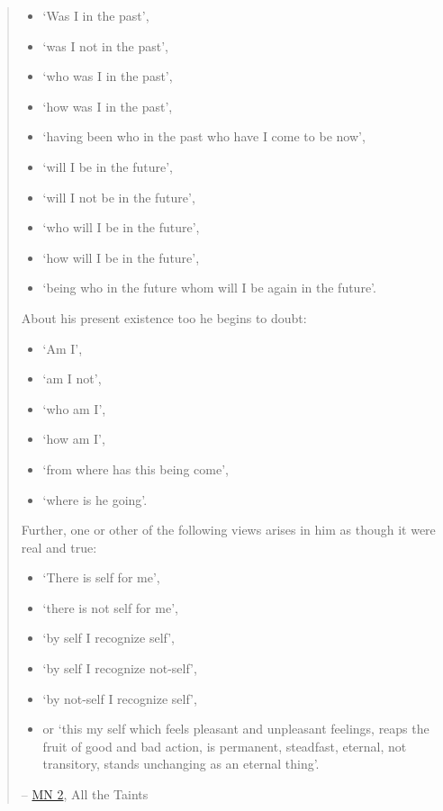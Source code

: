 \begin{quote}
\begin{itemize}
\item
  `Was I in the past',
\item
  `was I not in the past',
\item
  `who was I in the past',
\item
  `how was I in the past',
\item
  `having been who in the past who have I come to be now',
\item
  `will I be in the future',
\item
  `will I not be in the future',
\item
  `who will I be in the future',
\item
  `how will I be in the future',
\item
  `being who in the future whom will I be again in the future'.
\end{itemize}

About his present existence too he begins to doubt:

\begin{itemize}
\item
  `Am I',
\item
  `am I not',
\item
  `who am I',
\item
  `how am I',
\item
  `from where has this being come',
\item
  `where is he going'.
\end{itemize}

Further, one or other of the following views arises in him as though it were real and true:

\begin{itemize}
\item
  `There is self for me',
\item
  `there is not self for me',
\item
  `by self I recognize self',
\item
  `by self I recognize not-self',
\item
  `by not-self I recognize self',
\item
  or `this my self which feels pleasant and unpleasant feelings, reaps the fruit of good and bad action, is permanent, steadfast, eternal, not transitory, stands unchanging as an eternal thing'.
\end{itemize}

 -- \href{https://suttacentral.net/mn2/en/bodhi}{MN 2}, All the Taints
\end{quote}

